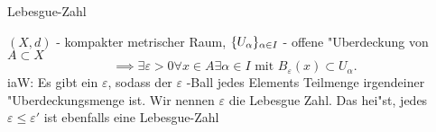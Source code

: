 \documentclass[class=article, crop=false]{standalone}
\begin{document}
\begin{zettel}{Lebesgue-Zahl}
\begin{flashcard}[]{}
	\begin{definition}
		$(X,d)$ - kompakter metrischer Raum,
		$\set{ U_{\alpha}  }_{\alpha \in  I}$ - offene "Uberdeckung von $A \subset X$
		\[
			\implies \exists \varepsilon > 0 \forall x \in  A \exists \alpha \in  I \text{ mit } B_{\varepsilon }(x) \subset U_{\alpha }
		.\]
		iaW: Es gibt ein $\varepsilon$, sodass der $\varepsilon$ -Ball  jedes Elements Teilmenge irgendeiner "Uberdeckungsmenge ist. Wir nennen $\varepsilon $ die Lebesgue Zahl. Das hei"st, jedes $\varepsilon \leq \varepsilon'$ ist ebenfalls eine Lebesgue-Zahl
	\end{definition}
\end{flashcard}
\end{zettel}
\end{document}
